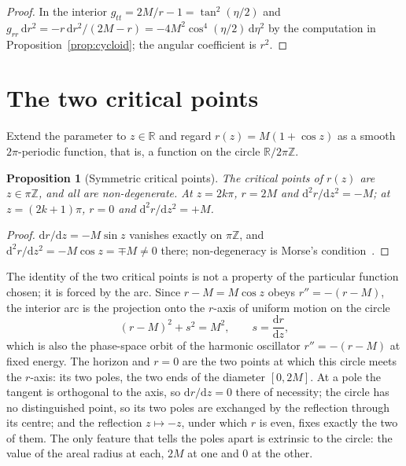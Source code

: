 \documentclass{iopjournal}
\theoremstyle{plain}
\newtheorem{proposition}[theorem]{Proposition}
\theoremstyle{remark}
\newcommand{\dd}{\mathrm{d}}
\begin{document}
\begin{proof}
In the interior $g_{tt}=2M/r-1=\tan^{2}(\eta/2)$ and $g_{rr}\,\dd r^{2}=-r\,\dd r^{2}/(2M-r)=-4M^{2}\cos^{4}(\eta/2)\,\dd\eta^{2}$ by the computation in Proposition~\ref{prop:cycloid}; the angular coefficient is $r^{2}$.
\end{proof}

\section{The two critical points}\label{sec:critical}

Extend the parameter to $z\in\mathbb{R}$ and regard $r(z)=M(1+\cos z)$ as a smooth $2\pi$-periodic function, that is, a function on the circle $\mathbb{R}/2\pi\mathbb{Z}$.

\begin{proposition}[Symmetric critical points]\label{prop:critical}
The critical points of $r(z)$ are $z\in\pi\mathbb{Z}$, and all are non-degenerate. At $z=2k\pi$, $r=2M$ and $\dd^{2}r/\dd z^{2}=-M$; at $z=(2k+1)\pi$, $r=0$ and $\dd^{2}r/\dd z^{2}=+M$.
\end{proposition}

\begin{proof}
$\dd r/\dd z=-M\sin z$ vanishes exactly on $\pi\mathbb{Z}$, and $\dd^{2}r/\dd z^{2}=-M\cos z=\mp M\neq0$ there; non-degeneracy is Morse's condition~\cite{Milnor1963}.
\end{proof}

The identity of the two critical points is not a property of the particular function chosen; it is forced by the arc. Since $r-M=M\cos z$ obeys $r''=-(r-M)$, the interior arc is the projection onto the $r$-axis of uniform motion on the circle
\begin{equation}\label{eq:circle}
(r-M)^{2}+s^{2}=M^{2},\qquad s=\frac{\dd r}{\dd z},
\end{equation}
which is also the phase-space orbit of the harmonic oscillator $r''=-(r-M)$ at fixed energy. The horizon and $r=0$ are the two points at which this circle meets the $r$-axis: its two poles, the two ends of the diameter $[0,2M]$. At a pole the tangent is orthogonal to the axis, so $\dd r/\dd z=0$ there of necessity; the circle has no distinguished point, so its two poles are exchanged by the reflection through its centre; and the reflection $z\mapsto-z$, under which $r$ is even, fixes exactly the two of them. The only feature that tells the poles apart is extrinsic to the circle: the value of the areal radius at each, $2M$ at one and $0$ at the other.
\end{document}
